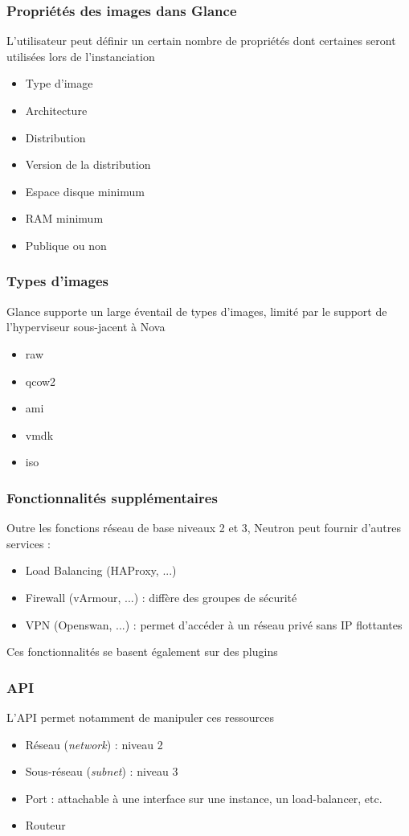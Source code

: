   \begin{frame}
    \frametitle{Propriétés des images dans Glance}
    L'utilisateur peut définir un certain nombre de propriétés dont certaines seront utilisées lors de l'instanciation
    \begin{itemize}
      \item Type d'image
      \item Architecture
      \item Distribution
      \item Version de la distribution
      \item Espace disque minimum
      \item RAM minimum
      \item Publique ou non
    \end{itemize}
  \end{frame}

  \begin{frame}
    \frametitle{Types d'images}
    Glance supporte un large éventail de types d'images, limité par le support de l'hyperviseur sous-jacent à Nova
    \begin{itemize}
      \item raw
      \item qcow2
      \item ami
      \item vmdk
      \item iso
    \end{itemize}
  \end{frame}

  \begin{frame}
    \frametitle{Fonctionnalités supplémentaires}
    Outre les fonctions réseau de base niveaux 2 et 3, Neutron peut fournir d'autres services :
    \begin{itemize}
      \item Load Balancing (HAProxy, ...)
      \item Firewall (vArmour, ...) : diffère des groupes de sécurité
      \item VPN (Openswan, ...) : permet d'accéder à un réseau privé sans IP flottantes
    \end{itemize}
    Ces fonctionnalités se basent également sur des plugins
  \end{frame}

  \begin{frame}
    \frametitle{API}
    L'API permet notamment de manipuler ces ressources
    \begin{itemize}
      \item Réseau (\textit{network}) : niveau 2
      \item Sous-réseau (\textit{subnet}) : niveau 3
      \item Port : attachable à une interface sur une instance, un load-balancer, etc.
      \item Routeur
    \end{itemize}
  \end{frame}

